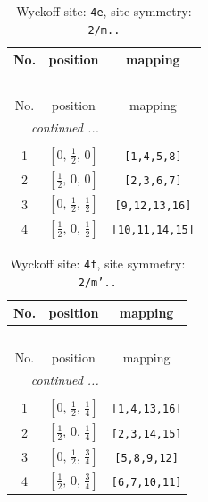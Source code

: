 \documentclass[fleqn,8pt]{jsarticle}
\begin{document}
\begin{longtable}{ccc}
\caption{Wyckoff site: {\tt 4e}, site symmetry: {\tt 2/m..}}
 \\
 \hline \hline
No. & position & mapping \\ \hline \endfirsthead

\multicolumn{2}{l}{\tablename\ \thetable{}} \\
 \hline \hline
No. & position & mapping \\ \hline \endhead

 \hline \hline
\multicolumn{2}{r}{\footnotesize\it continued ...} \\ \endfoot

 \hline \hline
\multicolumn{2}{r}{} \\ \endlastfoot

1 & $\left[ 0,\, \frac{1}{2},\, 0 \right]$ & {\tt [1,4,5,8]} \\ \hline
2 & $\left[ \frac{1}{2},\, 0,\, 0 \right]$ & {\tt [2,3,6,7]} \\ \hline
3 & $\left[ 0,\, \frac{1}{2},\, \frac{1}{2} \right]$ & {\tt [9,12,13,16]} \\ \hline
4 & $\left[ \frac{1}{2},\, 0,\, \frac{1}{2} \right]$ & {\tt [10,11,14,15]} \\
\end{longtable}
\renewcommand{\arraystretch}{1.2}
\begin{longtable}{ccc}
\caption{Wyckoff site: {\tt 4f}, site symmetry: {\tt 2/m'..}}
 \\
 \hline \hline
No. & position & mapping \\ \hline \endfirsthead

\multicolumn{2}{l}{\tablename\ \thetable{}} \\
 \hline \hline
No. & position & mapping \\ \hline \endhead

 \hline \hline
\multicolumn{2}{r}{\footnotesize\it continued ...} \\ \endfoot

 \hline \hline
\multicolumn{2}{r}{} \\ \endlastfoot

1 & $\left[ 0,\, \frac{1}{2},\, \frac{1}{4} \right]$ & {\tt [1,4,13,16]} \\ \hline
2 & $\left[ \frac{1}{2},\, 0,\, \frac{1}{4} \right]$ & {\tt [2,3,14,15]} \\ \hline
3 & $\left[ 0,\, \frac{1}{2},\, \frac{3}{4} \right]$ & {\tt [5,8,9,12]} \\ \hline
4 & $\left[ \frac{1}{2},\, 0,\, \frac{3}{4} \right]$ & {\tt [6,7,10,11]} \\
\end{longtable}
\end{document}
